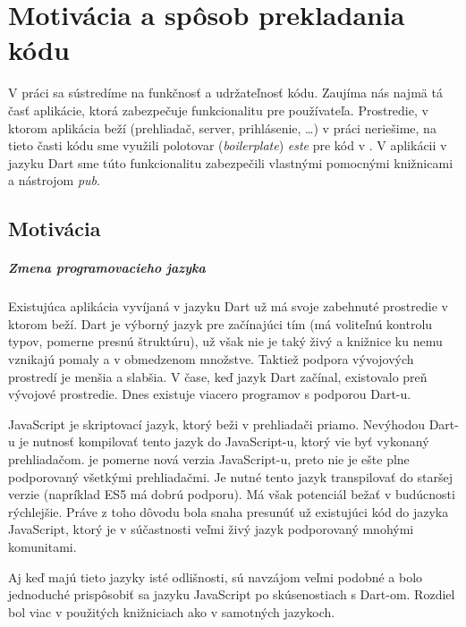 \chapter{Motivácia a spôsob prekladania kódu}%

\label{kap:motivacia} %

V práci sa sústredíme na funkčnosť a udržateľnosť kódu. Zaujíma nás najmä tá časť aplikácie, ktorá zabezpečuje funkcionalitu pre používateľa. Prostredie, v ktorom aplikácia beží (prehliadač, server, prihlásenie, \ldots) v práci neriešime, na tieto časti kódu sme využili polotovar (\emph{boilerplate})
\emph{este} \cite{Este} pre kód v \JS{}. 
V aplikácii v jazyku Dart sme túto funkcionalitu zabezpečili vlastnými pomocnými knižnicami a nástrojom \emph{pub}.

\section{Motivácia}
\paragraph{Zmena programovacieho jazyka}
Existujúca aplikácia vyvíjaná v jazyku Dart už má svoje zabehnuté prostredie v ktorom beží. Dart je výborný jazyk pre začínajúci tím (má voliteľnú kontrolu typov, pomerne presnú štruktúru), už však nie je taký živý a knižnice ku nemu vznikajú pomaly a v obmedzenom množstve. 
Taktiež podpora vývojových prostredí je menšia a slabšia. V čase, keď jazyk Dart začínal, existovalo preň vývojové prostredie. Dnes existuje viacero programov s podporou Dart-u. 

JavaScript je skriptovací jazyk, ktorý beži v prehliadači priamo. Nevýhodou Dart-u je nutnosť kompilovať tento jazyk do JavaScript-u, ktorý vie byť vykonaný prehliadačom. \JS{} je pomerne nová verzia JavaScript-u, preto nie je ešte plne podporovaný všetkými prehliadačmi. Je nutné tento jazyk transpilovať do staršej verzie (napríklad ES5 má dobrú podporu). Má však potenciál bežať v budúcnosti rýchlejšie.
Práve z toho dôvodu bola snaha presunúť už existujúci kód do jazyka JavaScript, ktorý je v súčastnosti veľmi živý jazyk podporovaný mnohými komunitami. 

Aj keď majú tieto jazyky isté odlišnosti, sú navzájom veľmi podobné a bolo jednoduché prispôsobiť sa jazyku JavaScript po skúsenostiach s Dart-om.
Rozdiel bol viac v použitých knižniciach ako v samotných jazykoch.

